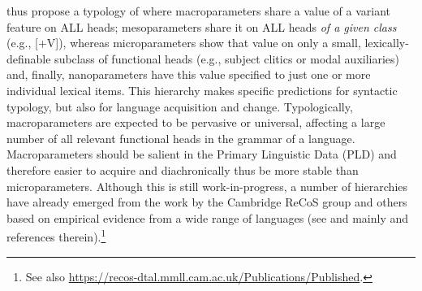 \documentclass[output=paper,colorlinks,citecolor=brown]{langscibook}
\begin{document}
\citet{mm:biberauer_significance_2012, mm:biberauerroberts2017} thus propose a typology of  where macroparameters share a value of a variant feature on ALL heads; mesoparameters share it on ALL heads \textit{of a given class} (e.g., [+V]), whereas microparameters show that value on only a small, lexically-definable subclass of functional heads (e.g., subject clitics or modal auxiliaries) and, finally, nanoparameters have this value specified to just one or more individual lexical items. This hierarchy makes specific predictions for syntactic typology, but also for language acquisition and change. Typologically, macroparameters are expected to be pervasive or universal, affecting a large number of all relevant functional heads in the grammar of a language. Macroparameters should be salient in the Primary Linguistic Data (PLD) and therefore easier to acquire and diachronically thus be more stable than microparameters. Although this is still work-in-progress, a number of hierarchies have already emerged from the work by the Cambridge ReCoS group and others based on empirical evidence from a wide range of languages (see \citealt{mm:biberauerholmbergrobertssheehan2014, mm:sheehan2014, mm:vanderwal2020, mm:ledgeway_latin_2012, mm:ledgeway_cambridge_2017, mm:kinn2017, mm:douglas_unifying_2017} and mainly \citealt{mm:roberts_parameter_2019} and references therein).\footnote{See also \url{https://recos-dtal.mmll.cam.ac.uk/Publications/Published}.}
\end{document}
